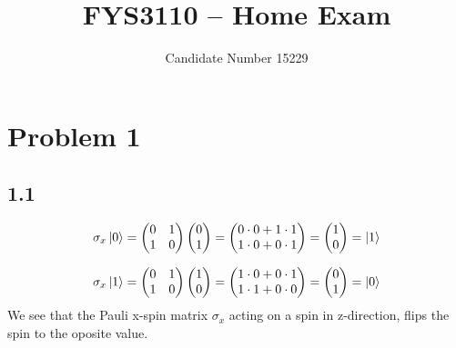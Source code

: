 \documentclass[12p,a4paper]{article}
\newcommand{\0}{\ket{0}}
\newcommand{\1}{\ket{1}}
\begin{document}
\title{FYS3110 -- Home Exam}
\author{
    \begin{tabular}{r l}
        Candidate Number 15229
    \end{tabular}}

\maketitle




\section*{Problem 1}
\subsection*{1.1}
\begin{align*}
    \sigma_x \0 = \begin{pmatrix} 0 & 1 \\ 1 & 0 \end{pmatrix} \begin{pmatrix} 0 \\ 1 \end{pmatrix}
    = \begin{pmatrix} 0 \cdot 0 + 1 \cdot 1 \\ 1 \cdot 0 + 0 \cdot 1 \end{pmatrix}
    = \begin{pmatrix} 1 \\ 0 \end{pmatrix} = \1
\end{align*}

\begin{align*}
    \sigma_x \1 = \begin{pmatrix} 0 & 1 \\ 1 & 0 \end{pmatrix} \begin{pmatrix} 1 \\ 0 \end{pmatrix}
    = \begin{pmatrix} 1 \cdot 0 + 0 \cdot 1 \\ 1 \cdot 1 + 0 \cdot 0 \end{pmatrix}
    = \begin{pmatrix} 0 \\ 1 \end{pmatrix} = \0
\end{align*}
We see that the Pauli x-spin matrix $\sigma_x$ acting on a spin in z-direction, flips the spin to the oposite value.
\end{document}
